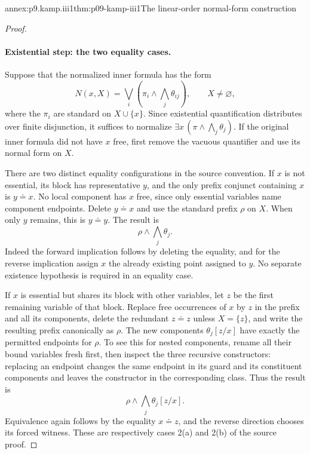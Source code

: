 \begin{annexitem}{annex:p9.kamp.iii1}{thm:p09-kamp-iii1}{The linear-order normal-form construction}
\begin{proof}
\paragraph{Existential step: the two equality cases.}
Suppose that the normalized inner formula has the form
\[
 N(x,X)=\bigvee_i\left(\pi_i\land\bigwedge_j\theta_{ij}\right),
 \qquad X\ne\varnothing,
\]
where the \(\pi_i\) are standard on \(X\cup\{x\}\).
Since existential quantification distributes over finite disjunction, it
suffices to normalize
\(\exists x\,(\pi\land\bigwedge_j\theta_j)\).
If the original inner formula did not have \(x\) free, first remove the
vacuous quantifier and use its normal form on \(X\).

There are two distinct equality configurations in the source convention.
If \(x\) is not essential, its block has representative \(y\), and the
only prefix conjunct containing \(x\) is \(y\doteq x\).
No local component has \(x\) free, since only essential variables name
component endpoints.  Delete \(y\doteq x\) and use the standard prefix
\(\rho\) on \(X\).  When only \(y\) remains, this is
\(y\doteq y\).  The result is
\[
 \rho\land\bigwedge_j\theta_j.
\]
Indeed the forward implication follows by deleting the equality, and for
the reverse implication assign \(x\) the already existing point assigned
to \(y\).  No separate existence hypothesis is required in an equality
case.

If \(x\) is essential but shares its block with other variables, let
\(z\) be the first remaining variable of that block.  Replace free
occurrences of \(x\) by \(z\) in the prefix and all its components,
delete the redundant \(z\doteq z\) unless \(X=\{z\}\), and write
the resulting prefix canonically as \(\rho\).  The new components
\(\theta_j[z/x]\) have exactly the permitted endpoints for \(\rho\).
To see this for nested components, rename all their bound variables fresh
first, then inspect the three recursive constructors: replacing an endpoint
changes the same endpoint in its guard and its constituent components and
leaves the constructor in the corresponding class.  Thus the result is
\[
 \rho\land\bigwedge_j\theta_j[z/x].
\]
Equivalence again follows by the equality \(x\doteq z\), and the reverse
direction chooses its forced witness.  These are respectively cases 2(a)
and 2(b) of the source proof.


\end{proof}
\end{annexitem}
